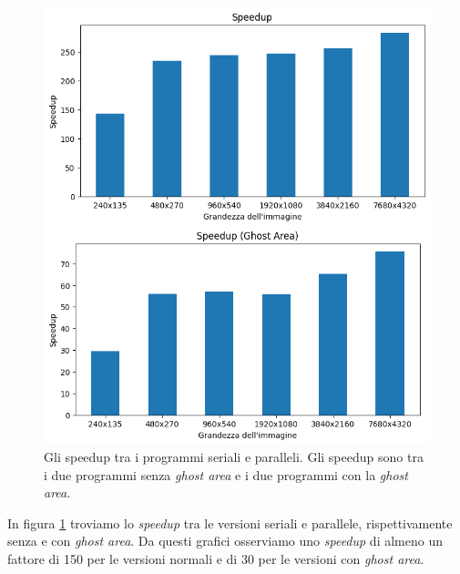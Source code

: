 \documentclass[12pt,a4paper,openright,twoside]{report}
\begin{document}
\begin{figure}[h]
    \centering
    \includegraphics[width=\textwidth]{speedup.png}
    \caption[Gli Gli speedup tra i programmi seriali e paralleli.]{Gli speedup tra i programmi seriali e paralleli. Gli speedup sono tra i due programmi senza \textit{ghost area} e i due programmi con la \textit{ghost area}.}
    \label{img:speedup}
\end{figure}

In figura \ref{img:speedup} troviamo lo \textit{speedup} tra le versioni seriali e parallele, rispettivamente senza e con \textit{ghost area}. Da questi grafici osserviamo uno \textit{speedup} di almeno un fattore di 150 per le versioni normali e di 30 per le versioni con \textit{ghost area}.
\end{document}
